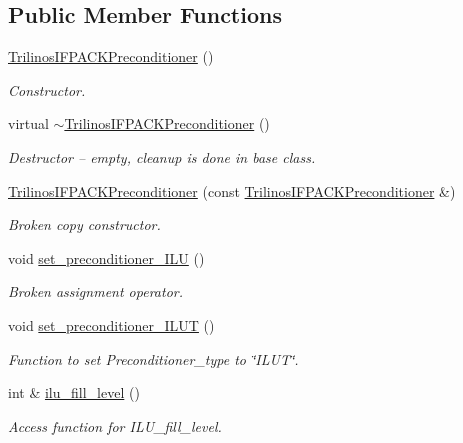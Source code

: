 \subsection*{Public Member Functions}
\begin{DoxyCompactItemize}
\item 
\hyperlink{classoomph_1_1TrilinosIFPACKPreconditioner_a7dabecb0dcc6805882bb84571a4d3a7a}{Trilinos\+I\+F\+P\+A\+C\+K\+Preconditioner} ()
\begin{DoxyCompactList}\small\item\em Constructor. \end{DoxyCompactList}\item 
virtual \hyperlink{classoomph_1_1TrilinosIFPACKPreconditioner_a0a2eedb33087f56c14edaeeebba2d8ed}{$\sim$\+Trilinos\+I\+F\+P\+A\+C\+K\+Preconditioner} ()
\begin{DoxyCompactList}\small\item\em Destructor -- empty, cleanup is done in base class. \end{DoxyCompactList}\item 
\hyperlink{classoomph_1_1TrilinosIFPACKPreconditioner_af8f36f8121b2c0eadf6791844f4c21fc}{Trilinos\+I\+F\+P\+A\+C\+K\+Preconditioner} (const \hyperlink{classoomph_1_1TrilinosIFPACKPreconditioner}{Trilinos\+I\+F\+P\+A\+C\+K\+Preconditioner} \&)
\begin{DoxyCompactList}\small\item\em Broken copy constructor. \end{DoxyCompactList}\item 
void \hyperlink{classoomph_1_1TrilinosIFPACKPreconditioner_a90203cd7833a99cd6070b7479651f76b}{set\+\_\+preconditioner\+\_\+\+I\+LU} ()
\begin{DoxyCompactList}\small\item\em Broken assignment operator. \end{DoxyCompactList}\item 
void \hyperlink{classoomph_1_1TrilinosIFPACKPreconditioner_a9b49fd29826d9a36c657c14d95a5115c}{set\+\_\+preconditioner\+\_\+\+I\+L\+UT} ()
\begin{DoxyCompactList}\small\item\em Function to set Preconditioner\+\_\+type to \char`\"{}\+I\+L\+U\+T\char`\"{}. \end{DoxyCompactList}\item 
int \& \hyperlink{classoomph_1_1TrilinosIFPACKPreconditioner_a569ef6b12aba2160634fe60bca19ffd9}{ilu\+\_\+fill\+\_\+level} ()
\begin{DoxyCompactList}\small\item\em Access function for I\+L\+U\+\_\+fill\+\_\+level. \end{DoxyCompactList}\item 

\end{DoxyCompactItemize}

